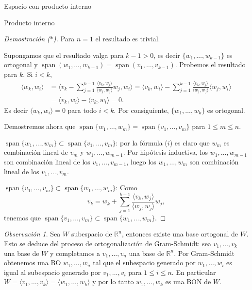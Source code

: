 \documentclass[a4paper,12pt,twoside,spanish,reqno]{amsbook}
\theoremstyle{definition}
\theoremstyle{remark}
\newtheorem{obs}{Observaci\'on}[section]
\newcommand{\la}{\langle}
\newcommand{\ra}{\rangle}
\newcommand{\R}{\mathbb R}
\begin{document}
\begin{chapter}{Espacio con producto interno}
\begin{section}{Producto interno}
\begin{proof}[Demostración ($*$)]
            Para $n= 1$ el resultado es trivial.
            
            Supongamos que el resultado valga para $k-1>0$, es decir  $\{w_1,\ldots, w_{k-1}\}$ es ortogonal y 
            $\operatorname{span}(w_1,\ldots, w_{k-1}) = \operatorname{span}(v_1,\ldots, v_{k-1})$. Probemos el resultado para $k$.  Si  $i < k$, 
            \begin{align*}
            \la w_k, w_i \ra &= \la  v_k - \sum_{j = 1}^{k-1} \frac{\la v_k,w_{j}\ra}{\la w_{j},w_{j}\ra}w_{j} , w_i \ra 
            = \la v_k, w_i\ra -  \sum_{j = 1}^{k-1} \frac{\la v_k,w_{j}\ra}{\la w_{j},w_{j}\ra}\la w_{j} , w_i \ra \\
            &=  \la v_k, w_i\ra -  \la v_k, w_i\ra = 0.
            \end{align*}
            Es decir $	\la w_k, w_i \ra =0$ para todo $i < k$. Por consiguiente,  $\{w_1,\ldots, w_{k}\}$ es ortogonal.
            
            Demostremos ahora que $\operatorname{span}\{w_1,\ldots, w_{m}\} = \operatorname{span}\{v_1,\ldots, v_{m}\}$ para $1 \le m \le n$. 
            
            $\operatorname{span}\{w_1,\ldots, w_{m}\} \subset \operatorname{span}\{v_1,\ldots, v_{m}\}$: por la fórmula ($i$) es claro que $w_m$  es combinación lineal de $v_m$ y $w_1,\ldots, w_{m-1}$. Por hipótesis inductiva, los $w_1,\ldots, w_{m-1}$ son combinación lineal de  los $v_1,\ldots, v_{m-1}$,  luego los $w_1,\ldots, w_{m}$ son combinación lineal de los  $v_1,\ldots, v_{m}$.
            
            $\operatorname{span}\{v_1,\ldots, v_{m}\} \subset \operatorname{span}\{w_1,\ldots, w_{m}\}$: Como
            $$
            v_k = w_k + \sum_{j = 1}^{k-1} \frac{\la v_k,w_{j}\ra}{\la w_{j},w_{j}\ra}w_{j},
            $$
            tenemos que 	$\operatorname{span}\{v_1,\ldots, v_{m}\} \subset \operatorname{span}\{w_1,\ldots, w_{m}\}$.
        \end{proof}
        
        
        \medskip
        
        \begin{obs} Sea $W$ subespacio de $\R^n$, entonces existe una base ortogonal de $W$. Esto se deduce del proceso de ortogonalización de Gram-Schmidt: sea $v_1,\ldots,v_k$ una base de $W$ y completamos a $v_{1},\ldots,v_n$ una base de $\R^n$. Por Gram-Schmidt obtenemos una BO $w_{1},\ldots,w_n$ tal que el subespacio generado  por $w_{1},\ldots,w_i$ es igual al subespacio generado por $v_{1},\ldots,v_i$ para $1 \le i \le n$. En  particular $W = \la v_{1},\ldots,v_k \ra =  \la w_{1},\ldots,w_k \ra$ y por lo tanto  $w_{1},\ldots,w_k$ es una BON de $W$.
            

\end{obs}
\end{section}
\end{chapter}
\end{document}
